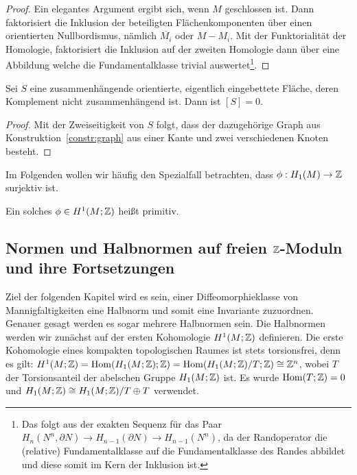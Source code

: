 \begin{proof}
	Ein elegantes Argument ergibt sich, wenn $M$ geschlossen ist. Dann faktorisiert die Inklusion der beteiligten Flächenkomponenten über einen orientierten Nullbordismus, nämlich $\overline{M_i}$ oder $M-M_i$. Mit der Funktorialität der Homologie, faktorisiert die Inklusion auf der zweiten Homologie dann über eine Abbildung welche die Fundamentalklasse trivial auswertet\footnote{Das folgt aus der exakten Sequenz für das Paar $H_n(N^n, \partial N) \to H_{n-1}(\partial N) \to H_{n-1}(N^n)$, da der Randoperator die (relative) Fundamentalklasse auf die Fundamentalklasse des Randes abbildet und diese somit im Kern der Inklusion ist.}.
\end{proof}
\begin{cor}
\label{cor:zshtrennendnullhomolog}
	Sei $S$ eine zusammenhängende orientierte, eigentlich eingebettete Fläche, deren Komplement nicht zusammenhängend ist. Dann ist $[S]=0$.  
\end{cor}
\begin{proof}
	Mit der Zweiseitigkeit von $S$ folgt, dass der dazugehörige Graph aus Konstruktion~\ref{constr:graph} aus einer Kante und zwei verschiedenen Knoten besteht.
\end{proof}

Im Folgenden wollen wir häufig den Spezialfall betrachten, dass $\phi: H_1(M) \to \mathbb{Z}$ surjektiv ist. 
\begin{defn}
	Ein solches $\phi \in H^1(M;\mathbb{Z})$ heißt primitiv.
\end{defn}

\subsection{Normen und Halbnormen auf freien $\mathbb{Z}$-Moduln und ihre Fortsetzungen}
    
    Ziel der folgenden Kapitel wird es sein, einer Diffeomorphieklasse von Mannigfaltigkeiten eine Halbnorm und somit eine Invariante zuzuordnen. Genauer gesagt werden es sogar mehrere Halbnormen sein. Die Halbnormen werden wir zunächst auf der ersten Kohomologie $H^1(M;\mathbb{Z})$ definieren. Die erste Kohomologie eines kompakten topologischen Raumes ist stets torsionsfrei, denn es gilt: $H^1(M;\mathbb{Z}) = \operatorname{Hom}(H_1(M;\mathbb{Z});\mathbb{Z}) = \operatorname{Hom}(H_1(M;\mathbb{Z})/T;\mathbb{Z}) \cong \mathbb{Z}^n$, wobei $T$ der Torsionsanteil der abelschen Gruppe $H_1(M;\mathbb{Z})$ ist. Es wurde $\operatorname{Hom}(T;\mathbb{Z})=0$ und $H_1(M;\mathbb{Z}) \cong H_1(M;\mathbb{Z})/T \oplus T$ verwendet.

